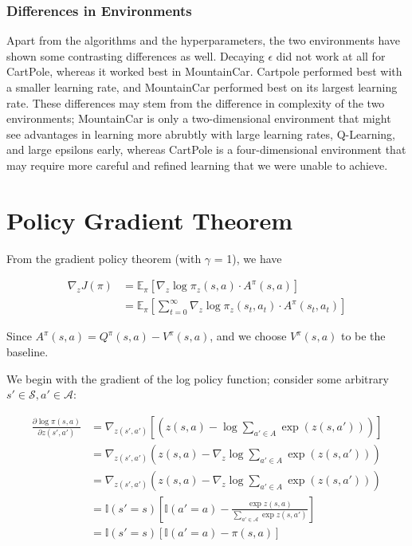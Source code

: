 \documentclass{article}
\begin{document}
\subsubsection{Differences in Environments}
Apart from the algorithms and the hyperparameters, the two environments have shown some
contrasting differences as well. Decaying $\epsilon$ did not work at all for CartPole, whereas
it worked best in MountainCar. Cartpole performed best with a smaller learning rate, and
MountainCar performed best on its largest learning rate. These differences may stem from the
difference in complexity of the two environments; MountainCar is only a two-dimensional environment
that might see advantages in learning more abrubtly with large learning rates, Q-Learning, and large epsilons early, whereas CartPole is a four-dimensional environment
that may require more careful and refined learning that we were unable to achieve.

\section{Policy Gradient Theorem}

From the gradient policy theorem (with $\gamma$ = 1), we have

\begin{align*}
  \nabla_z J(\pi) &= \mathbb{E}_{\pi} \left [ \nabla_{z} \log \pi_{z}(s, a) \cdot A^{\pi}(s,a) \right]\\
          &= \mathbb{E}_{\pi} \left [\sum_{t=0}^\infty \nabla_{z} \log \pi_{z}(s_t, a_t) \cdot A^{\pi}(s_t,a_t) \right]
\end{align*}

Since $A^\pi(s,a) = Q^\pi(s,a) - V^\pi(s,a)$, and we choose $V^\pi(s,a)$ to be the baseline.

We begin with the gradient of the log policy function; consider some arbitrary $s' \in
\mathcal{S}, a' \in \mathcal{A}$:

\begin{align*}
  \frac{\partial\log \pi(s,a)}{\partial z(s', a')} &= \nabla_{z(s', a')}\left[(z(s,a) - \log \sum_{a'\in A} \exp(z(s,a'))) \right]\\
                          &= \nabla_{z(s', a')}(z(s,a) - \nabla_{z} \log \sum_{a'\in A} \exp(z(s,a')))\\
                          &= \nabla_{z(s', a')}(z(s,a) - \nabla_{z} \log \sum_{a'\in A} \exp(z(s,a')))\\
                          &= \mathbb{I}(s' = s) \left [ \mathbb{I}(a' = a) - \frac{\exp z(s,a)}{\sum_{a'\in \mathcal{A}} \exp z(s,a')}\right ]\\
                          &= \mathbb{I}(s' = s) \left [\mathbb{I}(a' = a) - \pi (s,a) \right]
\end{align*}
\end{document}

